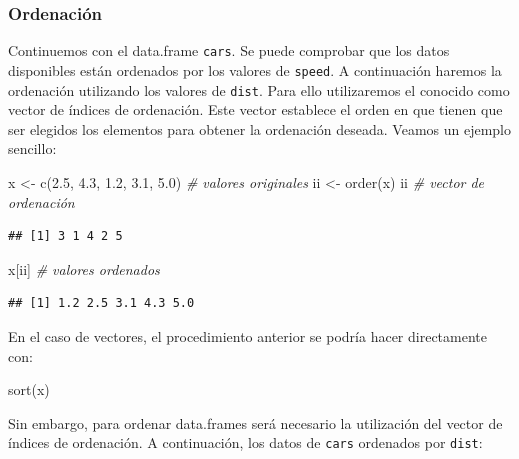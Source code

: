 \documentclass[
]{book}
\newenvironment{Shaded}{\begin{snugshade}}{\end{snugshade}}
\newcommand{\CommentTok}[1]{\textcolor[rgb]{0.56,0.35,0.01}{\textit{#1}}}
\newcommand{\FloatTok}[1]{\textcolor[rgb]{0.00,0.00,0.81}{#1}}
\newcommand{\FunctionTok}[1]{\textcolor[rgb]{0.00,0.00,0.00}{#1}}
\newcommand{\NormalTok}[1]{#1}
\newcommand{\OtherTok}[1]{\textcolor[rgb]{0.56,0.35,0.01}{#1}}
\theoremstyle{break}
\begin{document}
\hypertarget{ordenaciuxf3n}{%
\subsubsection{Ordenación}\label{ordenaciuxf3n}}

Continuemos con el data.frame \texttt{cars}.
Se puede comprobar que los datos disponibles están ordenados por
los valores de \texttt{speed}. A continuación haremos la ordenación utilizando
los valores de \texttt{dist}. Para ello utilizaremos el conocido como vector de
índices de ordenación.
Este vector establece el orden en que tienen que ser elegidos los
elementos para obtener la ordenación deseada.
Veamos un ejemplo sencillo:

\begin{Shaded}
\begin{Highlighting}[]
\NormalTok{x }\OtherTok{\textless{}{-}} \FunctionTok{c}\NormalTok{(}\FloatTok{2.5}\NormalTok{, }\FloatTok{4.3}\NormalTok{, }\FloatTok{1.2}\NormalTok{, }\FloatTok{3.1}\NormalTok{, }\FloatTok{5.0}\NormalTok{) }\CommentTok{\# valores originales}
\NormalTok{ii }\OtherTok{\textless{}{-}} \FunctionTok{order}\NormalTok{(x)}
\NormalTok{ii    }\CommentTok{\# vector de ordenación}
\end{Highlighting}
\end{Shaded}

\begin{verbatim}
## [1] 3 1 4 2 5
\end{verbatim}

\begin{Shaded}
\begin{Highlighting}[]
\NormalTok{x[ii] }\CommentTok{\# valores ordenados}
\end{Highlighting}
\end{Shaded}

\begin{verbatim}
## [1] 1.2 2.5 3.1 4.3 5.0
\end{verbatim}

En el caso de vectores, el procedimiento anterior se podría
hacer directamente con:

\begin{Shaded}
\begin{Highlighting}[]
\FunctionTok{sort}\NormalTok{(x)}
\end{Highlighting}
\end{Shaded}

Sin embargo, para ordenar data.frames será necesario la utilización del
vector de índices de ordenación. A continuación, los datos de \texttt{cars}
ordenados por \texttt{dist}:
\end{document}
